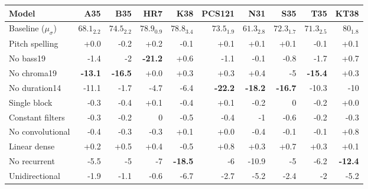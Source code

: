 \begin{tabular}{l|rrrrrrrrr}
Model               & A35            & B35            & HR7            & K38            & PCS121         & N31            & S35            & T35            & KT38           \\ \hline
Baseline ($\mu_\sigma$)     & $68.1_{2.2}$          & $74.5_{2.2}$           & $78.9_{0.9}$           & $78.8_{3.4}$           & $73.5_{1.9}$           & $61.3_{2.8}$           & $72.3_{1.7}$           & $71.3_{2.5}$           & $80_{1.8}$             \\ \hline
Pitch spelling      & +0.0           & -0.2           & +0.2           & -0.1           & +0.1           & +0.1           & +0.1           & -0.1           & +0.1           \\
No \gls{bass19}     & -1.4           & -2             & \textbf{-21.2} & +0.6           & -1.1           & -0.1           & -0.8           & -1.7           & +0.7           \\
No \gls{chroma19}   & \textbf{-13.1} & \textbf{-16.5} & +0.0           & +0.3           & +0.3           & +0.4           & -5             & \textbf{-15.4} & +0.3           \\
No \gls{duration14} & -11.1          & -1.7           & -4.7           & -6.4           & \textbf{-22.2} & \textbf{-18.2} & \textbf{-16.7} & -10.3          & -10            \\
Single block        & -0.3           & -0.4           & +0.1           & -0.4           & +0.1           & -0.2           & 0              & -0.2           & +0.0           \\
Constant filters    & -0.3           & -0.2           & 0              & -0.5           & -0.4           & -1             & -0.6           & -0.2           & -0.3           \\
No convolutional    & -0.4           & -0.3           & -0.3           & +0.1           & +0.0           & -0.4           & -0.1           & -0.1           & +0.8           \\
Linear dense        & +0.2           & +0.5           & +0.4           & -0.5           & +0.8           & +0.3           & +0.7           & +0.3           & +0.1           \\
No recurrent        & -5.5           & -5             & -7             & \textbf{-18.5} & -6             & -10.9          & -5             & -6.2           & \textbf{-12.4} \\
Unidirectional      & -1.9           & -1.1           & -0.6           & -6.7           & -2.7           & -5.2           & -2.4           & -2             & -5.2          
\end{tabular}
